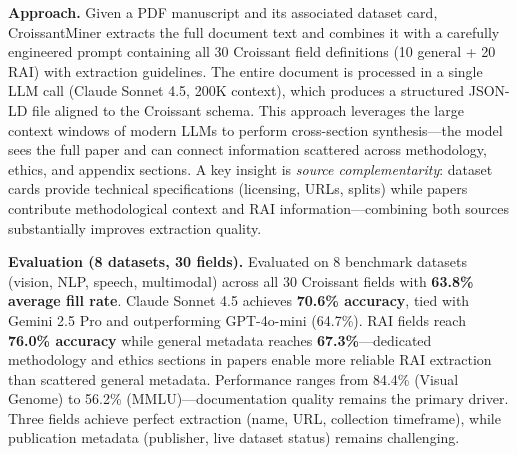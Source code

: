 \documentclass[11pt,a4paper]{article}
\begin{document}
\vspace{0.1em}

\textbf{Approach.}\quad
Given a PDF manuscript and its associated dataset card, CroissantMiner extracts the full document text and combines it with a carefully engineered prompt containing all 30 Croissant field definitions (10 general + 20 RAI) with extraction guidelines. The entire document is processed in a single LLM call (Claude Sonnet 4.5, 200K context), which produces a structured JSON-LD file aligned to the Croissant schema. This approach leverages the large context windows of modern LLMs to perform cross-section synthesis---the model sees the full paper and can connect information scattered across methodology, ethics, and appendix sections. A key insight is \textit{source complementarity}: dataset cards provide technical specifications (licensing, URLs, splits) while papers contribute methodological context and RAI information---combining both sources substantially improves extraction quality.

\vspace{0.1em}

\textbf{Evaluation (8 datasets, 30 fields).}\quad
Evaluated on 8 benchmark datasets (vision, NLP, speech, multimodal) across all 30 Croissant fields with \textbf{63.8\% average fill rate}. Claude Sonnet 4.5 achieves \textbf{70.6\% accuracy}, tied with Gemini 2.5 Pro and outperforming GPT-4o-mini (64.7\%). RAI fields reach \textbf{76.0\% accuracy} while general metadata reaches \textbf{67.3\%}---dedicated methodology and ethics sections in papers enable more reliable RAI extraction than scattered general metadata. Performance ranges from 84.4\% (Visual Genome) to 56.2\% (MMLU)---documentation quality remains the primary driver. Three fields achieve perfect extraction (name, URL, collection timeframe), while publication metadata (publisher, live dataset status) remains challenging.

\vspace{0.35em}
\end{document}

